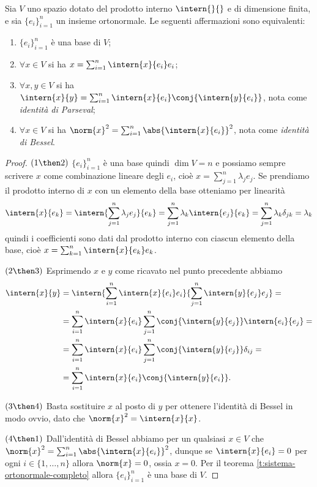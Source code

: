 \begin{teorema} \label{t:identita-parseval-bessel}
	Sia $V$ uno spazio dotato del prodotto interno $\intern{}{}$ e di dimensione finita, e sia $\{e_i\}_{i=1}^n$ un insieme ortonormale.
	Le seguenti affermazioni sono equivalenti:
	\begin{enumerate}
		\item $\{e_i\}_{i=1}^n$ è una base di $V$;
		\item $\forall x\in V$ si ha $x=\sum_{i=1}^n\intern{x}{e_i}e_i$;
		\item $\forall x,y\in V$ si ha $\intern{x}{y}=\sum_{i=1}^n\intern{x}{e_i}\conj{\intern{y}{e_i}}$, nota come \emph{identità di Parseval};
		\item $\forall x\in V$ si ha $\norm{x}^2=\sum_{i=1}^n\abs{\intern{x}{e_i}}^2$, nota come \emph{identità di Bessel}.
	\end{enumerate}
\end{teorema}
\begin{proof}
	$(1\then 2)$ $\{e_i\}_{i=1}^n$ è una base quindi $\dim V=n$ e possiamo sempre scrivere $x$ come combinazione lineare degli $e_i$, cioè $x=\sum_{j=1}^n\lambda_j e_j$.
	Se prendiamo il prodotto interno di $x$ con un elemento della base otteniamo per linearità
	\begin{equation}
		\intern{x}{e_k}=\intern{\sum_{j=1}^n\lambda_j e_j}{e_k}=\sum_{j=1}^n\lambda_k\intern{e_j}{e_k}=\sum_{j=1}^n\lambda_k\delta_{jk}=\lambda_k
	\end{equation}
	quindi i coefficienti sono dati dal prodotto interno con ciascun elemento della base, cioè $x=\sum_{k=1}^n\intern{x}{e_k} e_k$.

	$(2\then 3)$ Esprimendo $x$ e $y$ come ricavato nel punto precedente abbiamo
	\begin{equation}
		\begin{split}
			\intern{x}{y}&=\intern{\sum_{i=1}^n\intern{x}{e_i}e_i}{\sum_{j=1}^n\intern{y}{e_j}e_j}=\\
			&=\sum_{i=1}^n\intern{x}{e_i}\sum_{j=1}^n\conj{\intern{y}{e_j}}\intern{e_i}{e_j}=\\
			&=\sum_{i=1}^n\intern{x}{e_i}\sum_{j=1}^n\conj{\intern{y}{e_j}}\delta_{ij}=\\
			&=\sum_{i=1}^n\intern{x}{e_i}\conj{\intern{y}{e_i}}.
		\end{split}
	\end{equation}
	
	$(3\then 4)$ Basta sostituire $x$ al posto di $y$ per ottenere l'identità di Bessel in modo ovvio, dato che $\norm{x}^2=\intern{x}{x}$.

	$(4\then 1)$ Dall'identità di Bessel abbiamo per un qualsiasi $x\in V$ che $\norm{x}^2=\sum_{i=1}^n\abs{\intern{x}{e_i}}^2$, dunque se $\intern{x}{e_i}=0$ per ogni $i\in\{1,\dots,n\}$ allora $\norm{x}=0$, ossia $x=0$.
	Per il teorema \ref{t:sistema-ortonormale-completo} allora $\{e_i\}_{i=1}^n$ è una base di $V$.
\end{proof}

